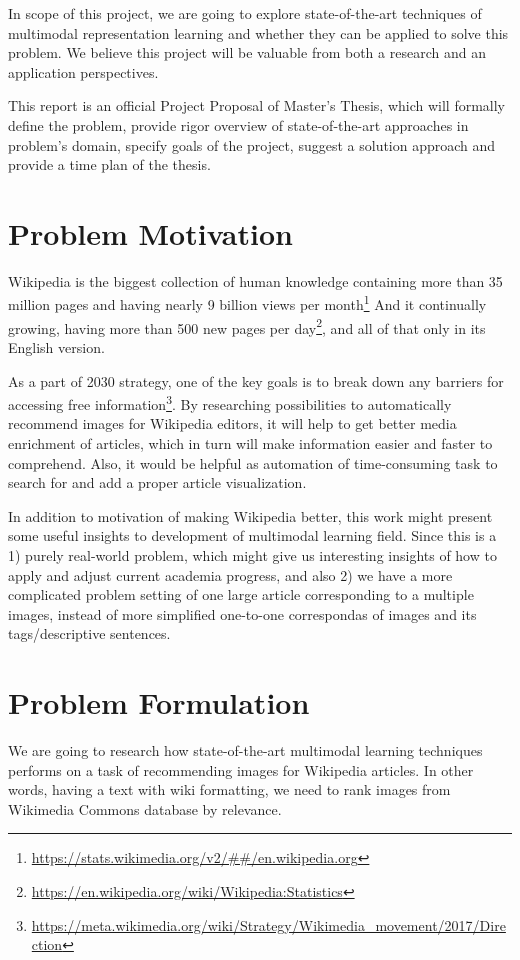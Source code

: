 \documentclass[runningheads]{llncs}
\begin{document}
In scope of this project, we are going to explore state-of-the-art techniques of multimodal representation learning and whether they can be applied to solve this problem. We believe this project will be valuable from both a research and an application perspectives.

This report is an official Project Proposal of Master's Thesis, which will formally define the problem, provide rigor overview of state-of-the-art approaches in problem's domain, specify goals of the project, suggest a solution approach and provide a time plan of the thesis.


\section{Problem Motivation}
Wikipedia is the biggest collection of human knowledge containing more than 35 million pages and having nearly 9 billion views per month\footnote{\url{https://stats.wikimedia.org/v2/##/en.wikipedia.org}} And it continually growing, having more than 500 new pages per day\footnote{\url{https://en.wikipedia.org/wiki/Wikipedia:Statistics}}, and all of that only in its English version.

As a part of 2030 strategy, one of the key goals is to break down any barriers for accessing free information\footnote{\url{https://meta.wikimedia.org/wiki/Strategy/Wikimedia_movement/2017/Direction}}. By researching possibilities to automatically recommend images for Wikipedia editors, it will help to get better media enrichment of articles, which in turn will make information easier and faster to comprehend\cite{ref_image_attention}. Also, it would be helpful as automation of time-consuming task to search for and add a proper article visualization. 

In addition to motivation of making Wikipedia better, this work might present some useful insights to development of multimodal learning field. Since this is a 1) purely real-world problem, which might give us interesting insights of how to apply and adjust current academia progress, and also 2) we have a more complicated problem setting of one large article corresponding to a multiple images, instead of more simplified one-to-one correspondas of images and its tags/descriptive sentences.


\section{Problem Formulation}
We are going to research how state-of-the-art multimodal learning techniques performs on a task of recommending images for Wikipedia articles. In other words, having a text with wiki formatting, we need to rank images from Wikimedia Commons database\cite{ref_wiki_commons} by relevance.
\end{document}
